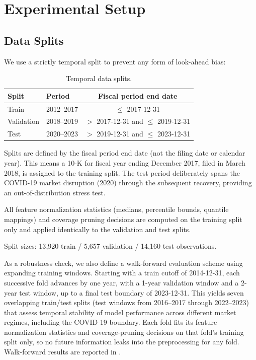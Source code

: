 \section{Experimental Setup}
\label{sec:setup}

\subsection{Data Splits}
\label{sec:splits}

We use a strictly temporal split to prevent any form of look-ahead bias:

\begin{table}[ht]
  \centering
  \caption{Temporal data splits.}
  \label{tab:splits}
  \small
  \begin{tabular}{@{}llc@{}}
    \toprule
    Split & Period & Fiscal period end date \\
    \midrule
    Train & 2012--2017 & $\leq$ 2017-12-31 \\
    Validation & 2018--2019 & $>$ 2017-12-31 and $\leq$ 2019-12-31 \\
    Test & 2020--2023 & $>$ 2019-12-31 and $\leq$ 2023-12-31 \\
    \bottomrule
  \end{tabular}
\end{table}

Splits are defined by the fiscal period end date (not the filing date or calendar year). This means a 10-K for fiscal year ending December 2017, filed in March 2018, is assigned to the training split. The test period deliberately spans the COVID-19 market disruption (2020) through the subsequent recovery, providing an out-of-distribution stress test.

All feature normalization statistics (medians, percentile bounds, quantile mappings) and coverage pruning decisions are computed on the training split only and applied identically to the validation and test splits.

Split sizes: 13{,}920 train / 5{,}657 validation / 14{,}160 test observations.

As a robustness check, we also define a walk-forward evaluation scheme using expanding training windows. Starting with a train cutoff of 2014-12-31, each successive fold advances by one year, with a 1-year validation window and a 2-year test window, up to a final test boundary of 2023-12-31. This yields seven overlapping train/test splits (test windows from 2016--2017 through 2022--2023) that assess temporal stability of model performance across different market regimes, including the COVID-19 boundary. Each fold fits its feature normalization statistics and coverage-pruning decisions on that fold's training split only, so no future information leaks into the preprocessing for any fold. Walk-forward results are reported in .

